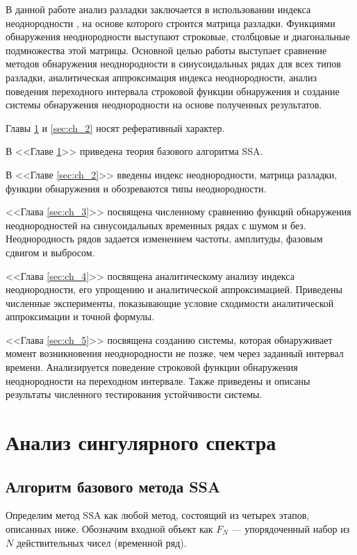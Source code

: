 \documentclass[specialist, substylefile = spbu.rtx,
			   subf, href, 12pt]{disser}
\begin{document}
В данной работе анализ разладки заключается в использовании индекса неоднородности \cite{Golyandina2001}, на основе которого строится матрица разладки. Функциями обнаружения неоднородности выступают строковые, столбцовые и диагональные подмножества этой матрицы. Основной целью работы выступает сравнение методов обнаружения неоднородности в синусоидальных рядах для всех типов разладки, аналитическая аппроксимация индекса неоднородности, анализ поведения переходного интервала строковой функции обнаружения и создание системы обнаружения неоднородности на основе полученных результатов.

Главы \ref{sec:ch_1} и \ref{sec:ch_2} носят реферативный характер.

В <<Главе \ref{sec:ch_1}>> приведена теория базового алгоритма SSA.

В <<Главе \ref{sec:ch_2}>> введены индекс неоднородности, матрица разладки, функции обнаружения и обозреваются типы неоднородности.

<<Глава \ref{sec:ch_3}>> посвящена численному сравнению функций обнаружения неоднородностей на синусоидальных временных рядах с шумом и без. Неоднородность рядов задается изменением частоты, амплитуды, фазовым сдвигом и выбросом.

<<Глава \ref{sec:ch_4}>> посвящена аналитическому анализу индекса неоднородности, его упрощению и аналитической аппроксимацией. Приведены численные эксперименты, показывающие условие сходимости аналитической аппроксимации и точной формулы.

<<Глава \ref{sec:ch_5}>> посвящена созданию системы, которая обнаруживает момент возникновения неоднородности не позже, чем через заданный интервал времени. Анализируется поведение строковой функции обнаружения неоднородности на переходном интервале. Также приведены и описаны результаты численного тестирования устойчивости системы.



\newpage
\chapter{Анализ сингулярного спектра} \label{sec:ch_1}
\section{Алгоритм базового метода SSA}
Определим метод SSA как любой метод, состоящий из четырех этапов, описанных ниже. Обозначим входной объект как $F_N$ --- упорядоченный набор из $N$ действительных чисел (временной ряд).
\end{document}
